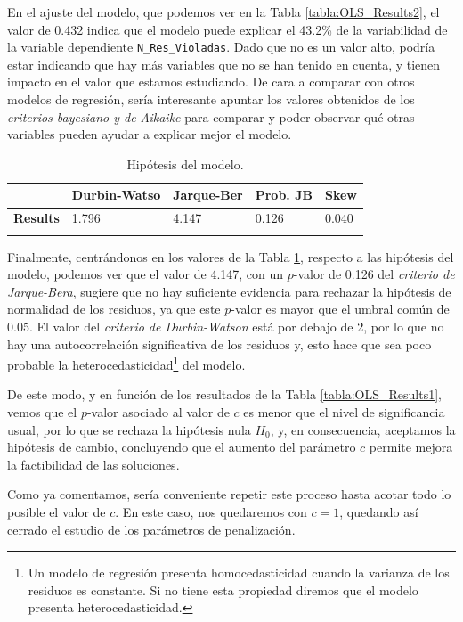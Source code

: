 \documentclass[12pt,a4paper]{book}
\begin{document}
En el ajuste del modelo, que podemos ver en la Tabla \ref{tabla:OLS_Results2}, el valor de 0.432 indica que el modelo puede explicar el 43.2\% de la variabilidad de la variable dependiente \texttt{N\_Res\_Violadas}. Dado que no es un valor alto, podría estar indicando que hay más variables que no se han tenido en cuenta, y tienen impacto en el valor que estamos estudiando. De cara a comparar con otros modelos de regresión, sería interesante apuntar los valores obtenidos de los \textsl{criterios bayesiano y de Aikaike} para comparar y poder observar qué otras variables pueden ayudar a explicar mejor el modelo.

\begin{longtable}[c]{l|l|l|l|l}
                 & \textbf{Durbin-Watso} & \textbf{Jarque-Ber} & \textbf{Prob. JB} & \textbf{Skew} \\ \hline
\endfirsthead
%
\endhead
%
\textbf{Results} & 1.796                 & 4.147               & 0.126             & 0.040         \\ 
\caption{Hipótesis del modelo.}
\label{tabla:OLS_Results3}\\
\end{longtable}

Finalmente, centrándonos en los valores de la Tabla \ref{tabla:OLS_Results3}, respecto a las hipótesis del modelo, podemos ver que el valor de 4.147, con un $p$-valor de 0.126 del \textsl{criterio de Jarque-Bera}, sugiere que no hay suficiente evidencia para rechazar la hipótesis de normalidad de los residuos, ya que este $p$-valor es mayor que el umbral común de 0.05. El valor del \textsl{criterio de Durbin-Watson} está por debajo de 2, por lo que no hay una autocorrelación significativa de los residuos y, esto hace que sea poco probable la heterocedasticidad\footnote{Un modelo de regresión presenta homocedasticidad cuando la varianza de los residuos es constante. Si no tiene esta propiedad diremos que el modelo presenta heterocedasticidad.} del modelo.

De este modo, y en función de los resultados de la Tabla \ref{tabla:OLS_Results1}, vemos que el $p$-valor asociado al valor de $c$ es menor que el nivel de significancia usual, por lo que se rechaza la hipótesis nula $H_0$, y, en consecuencia, aceptamos la hipótesis de cambio, concluyendo que el aumento del parámetro $c$ permite mejora la factibilidad de las soluciones.     

Como ya comentamos, sería conveniente repetir este proceso hasta acotar todo lo posible el valor de $c$. En este caso, nos quedaremos con $c=1$, quedando así cerrado el estudio de los parámetros de penalización.
\end{document}

